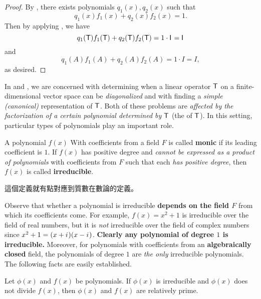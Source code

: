 \begin{proof}
By , there exists polynomials \(q_1(x), q_2(x)\) such that
\[
    q_1(x)f_1(x) + q_2(x)f_2(x) = 1.
\]
Then by applying , we have
\[
    q_1(\textsf{T})f_1(\textsf{T}) + q_2(\textsf{T})f_2(\textsf{T}) = 1 \cdot \textsf{I}_{_{}} = \textsf{I}_{_{}}
\]
and
\[
    q_1(A)f_1(A) + q_2(A)f_2(A) = 1 \cdot I = I,
\]
as desired.
\end{proof}

\begin{remark} \label{remark e.5}
In  and , we are concerned with determining when a linear operator \(\textsf{T}\) on a finite-dimensional vector space can be \emph{diagonalized} and with finding a \emph{simple (canonical)} representation of \(\textsf{T}\).
Both of these problems are \emph{affected by the factorization of a certain polynomial determined by \(\textsf{T}\)}
(the \emph{\CPOLY{}} of \(\textsf{T}\)).
In this setting, particular types of polynomials play an important role.
\end{remark}

\begin{appendix definition} \label{def e.4}
A polynomial \(f(x)\) With coefficients from a field \(F\) is called \textbf{monic} if its leading coefficient is \(1\).
If \(f(x)\) has positive degree and \emph{cannot be expressed as a product of polynomials} with coefficients from \(F\) such that each \emph{has positive degree}, then \(f(x)\) is called \textbf{irreducible}.
\end{appendix definition}

\begin{note}
這個定義就有點對應到質數在數論的定義。
\end{note}

\begin{remark} \label{remark e.6}
Observe that whether a polynomial is irreducible \textbf{depends on the field \(F\)} from which its coefficients come.
For example, \(f(x) = x^2 + 1\) is irreducible over the field of real numbers, but it is \emph{not} irreducible over the field of complex numbers since \(x^2 + 1 = (x + {i\mkern1mu})(x - {i\mkern1mu})\).
\textbf{Clearly any polynomial of degree \(1\) is irreducible.}
Moreover, for polynomials with coefficients from an \textbf{algebraically closed} field, the polynomials of degree \(1\) are \emph{the only} irreducible polynomials.
The following facts are easily established.
\end{remark}

\begin{appendix theorem} \label{thm e.6}
Let \(\phi(x)\) and \(f(x)\) be polynomials.
If \(\phi(x)\) is irreducible and \(\phi(x)\) does not divide \(f(x)\), then \(\phi(x)\) and \(f(x)\) are relatively prime.
\end{appendix theorem}

